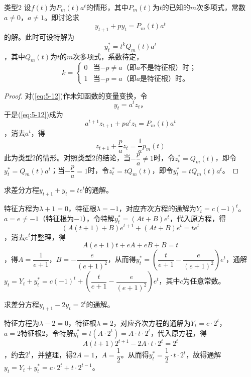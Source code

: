 		{\heiti 类型2}\label{prop:5-2} 设$f(t)$为$P_m(t)a^t$的情形，其中$P_m(t)$为$t$的已知的$m$次多项式，常数$a \neq 0$，$a \neq 1$。即讨论求
		\begin{equation}\label{eq:5-12}
			y_{t+1} + py_t = P_m(t)a^t
		\end{equation}
		的解。此时可设特解为$$y^*_t = t^kQ_m(t)a^t$$，其中$Q_m(t)$为$t$的$m$次多项式，系数待定，
		\begin{displaymath}
			k = 
			\begin{cases}
				0 & \text{当$-p \neq a$（即$a$不是特征根）时；} \\
				1 & \text{当$-p = a$（即$a$是特征根）时。}
			\end{cases}
		\end{displaymath}

		\begin{proof}
		对(\ref{eq:5-12})作未知函数的变量变换，令
		\begin{equation}\label{eq:5-13}
			y_t = a^tz_t \text{，}
		\end{equation}
		于是(\ref{eq:5-12})成为$$a^{t+1}z_{t+1} + pa^tz_t = P_m(t)a^t$$，消去$a^t$，得
		\begin{equation}\label{eq:5-14}
			z_{t+1} + \dfrac{p}{a} z_t = \dfrac{1}{a}p_m(t)
		\end{equation}
		此为{\heiti 类型2}的情形。对照{\heiti 类型2}的结论，当$-\dfrac{p}{a} \neq 1$时，令$z^*_t = Q_m(t)$，即令$y^*_t = Q_m(t)a^t$；当$-\dfrac{p}{a}=1$时，令$z^*_t = tQ_m(t)$，即令$y^*_t = tQ_m(t)a^t$。
		\end{proof}

		\example 求差分方程$y_{t+1} + y_t = te^t$的通解。

		\answer 特征方程为$\lambda + 1 = 0$，特征根$\lambda = -1$，对应齐次方程的通解为$Y_t = c(-1)^t$。$a = e \neq -1$（特征根为$-1$），令特解$y^*_t = (At + B)e^t$，代入原方程，得$$\left( A(t+1) + B \right) e^{t+1} + (At + B)e^t = te^t$$，消去$e^t$并整理，得$$A(e+1)t + eA + eB + B = t$$，得$A = \dfrac{1}{e+1}$，$B=-\dfrac{e}{(e+1)^2}$，从而得$y^*_t = \left(\dfrac{t}{e+1} - \dfrac{e}{(e+1)^2}\right)e^t$，通解$y_t = Y_t + y^*_t = c(-1)^t + \left(\dfrac{t}{e+1} - \dfrac{e}{(e+1)^2}\right) e^t$，其中$c$为任意常数。

		\example 求差分方程$y_{t+1} - 2y_t = 2^t$的通解。

		\answer 特征方程为$\lambda - 2 = 0$，特征根$\lambda = 2$，对应齐次方程的通解为$Y_t = c \cdot 2^t$，$a = 2 \text{特征根} 2$，令特解$y^*_t = t(A \cdot 2^t) = A \cdot t \cdot 2^t$，代入原方程，得$$A(t+1)2^{t+1} - 2A \cdot t \cdot 2^t = 2^t$$，约去$2^t$，并整理，得$2A=1$，$A=\dfrac{1}{2}$。从而得$y^*_t = \dfrac{1}{2} \cdot t \cdot 2^t$，故得通解$y_t = Y_t + y^*_t = c \cdot 2^t + t \cdot 2^{t-1}$。

